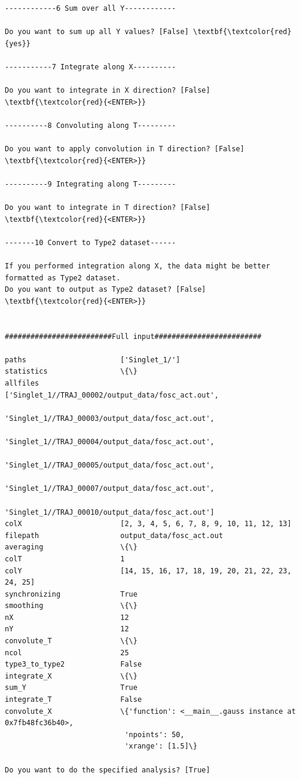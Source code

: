 \documentclass[a4paper,11pt,DIV=15,openany]{scrbook}
\begin{document}
\begin{oframed}
\begin{Verbatim}[commandchars=\\\{\}]
------------6 Sum over all Y------------

Do you want to sum up all Y values? [False] \textbf{\textcolor{red}{yes}}

-----------7 Integrate along X----------

Do you want to integrate in X direction? [False] \textbf{\textcolor{red}{<ENTER>}}

----------8 Convoluting along T---------

Do you want to apply convolution in T direction? [False] \textbf{\textcolor{red}{<ENTER>}}

----------9 Integrating along T---------

Do you want to integrate in T direction? [False] \textbf{\textcolor{red}{<ENTER>}}

-------10 Convert to Type2 dataset------

If you performed integration along X, the data might be better formatted as Type2 dataset.
Do you want to output as Type2 dataset? [False] \textbf{\textcolor{red}{<ENTER>}}


#########################Full input#########################

paths                      ['Singlet_1/']
statistics                 \{\}
allfiles                   ['Singlet_1//TRAJ_00002/output_data/fosc_act.out',
                            'Singlet_1//TRAJ_00003/output_data/fosc_act.out',
                            'Singlet_1//TRAJ_00004/output_data/fosc_act.out', 
                            'Singlet_1//TRAJ_00005/output_data/fosc_act.out', 
                            'Singlet_1//TRAJ_00007/output_data/fosc_act.out', 
                            'Singlet_1//TRAJ_00010/output_data/fosc_act.out']
colX                       [2, 3, 4, 5, 6, 7, 8, 9, 10, 11, 12, 13]
filepath                   output_data/fosc_act.out
averaging                  \{\}
colT                       1
colY                       [14, 15, 16, 17, 18, 19, 20, 21, 22, 23, 24, 25]
synchronizing              True
smoothing                  \{\}
nX                         12
nY                         12
convolute_T                \{\}
ncol                       25
type3_to_type2             False
integrate_X                \{\}
sum_Y                      True
integrate_T                False
convolute_X                \{'function': <__main__.gauss instance at 0x7fb48fc36b40>, 
                            'npoints': 50, 
                            'xrange': [1.5]\}

Do you want to do the specified analysis? [True] 




\end{Verbatim}
\end{oframed}
\end{document}
